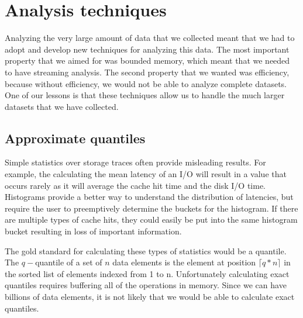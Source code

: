 \section{Analysis techniques}
\label{sec:analysis-techniques}

Analyzing the very large amount of data that we collected meant that
we had to adopt and develop new techniques for analyzing this data.
The most important property that we aimed for was bounded memory,
which meant that we needed to have streaming analysis.  The second
property that we wanted was efficiency, because without efficiency, we
would not be able to analyze complete datasets.  One of our lessons is
that these techniques allow us to handle the much larger datasets that
we have collected.

\subsection{Approximate quantiles}

Simple statistics over storage traces often provide misleading
results.  For example, the calculating the mean latency of an I/O will
result in a value that occurs rarely as it will average the cache hit
time and the disk I/O time.  Histograms provide a better way to
understand the distribution of latencies, but require the user to
preemptively determine the buckets for the histogram.  If there are
multiple types of cache hits, they could easily be put into the same
histogram bucket resulting in loss of important information.

The gold standard for calculating these types of statistics would be a
quantile.  The $q-$quantile of a set of $n$ data elements is the
element at position $\lceil q*n\rceil$ in the sorted list of elements
indexed from 1 to n.  Unfortunately calculating exact quantiles
requires buffering all of the operations in memory.  Since we can have
billions of data elements, it is not likely that we would be able to
calculate exact quantiles.

